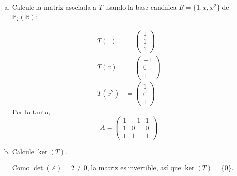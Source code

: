 \begin{example}
\begin{enumerate}[a.]
    \item Calcule la matriz asociada a $T$ usando la base canónica $B = \{1, x, x^2\}$ de $\mathbb{P}_2(\mathbb{R})$:
    \begin{myproof}
    \begin{align*}
        T(1) &= \begin{pmatrix} 1 \\ 1 \\ 1 \end{pmatrix} \\
        T(x) &= \begin{pmatrix} -1 \\ 0 \\ 1 \end{pmatrix} \\
        T(x^2) &= \begin{pmatrix} 1 \\ 0 \\ 1 \end{pmatrix}
    \end{align*}
    Por lo tanto,
    \[
    A = \begin{pmatrix}
        1 & -1 & 1 \\
        1 & 0 & 0 \\
        1 & 1 & 1
    \end{pmatrix}
    \]
    \end{myproof}
    \item Calcule $\ker(T)$. \begin{myproof} Como $\det(A) = 2 \neq 0$, la matriz es invertible, así que $\ker(T) = \{0\}$.\end{myproof}
    

\end{enumerate}
\end{example}
